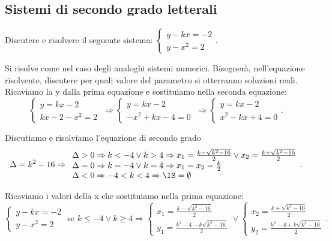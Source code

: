 \subsection{Sistemi di secondo grado letterali}
\begin{exrig}
\begin{esempio}
Discutere e risolvere il seguente sistema: \(\left\{\begin{array}{l}y-kx=-2\\y-x^2=2\end{array}\right.\).

Si risolve come nel caso degli analoghi sistemi numerici. Bisognerà, nell'equazione risolvente, discutere per quali valore del parametro si otterranno soluzioni reali. Ricaviamo la y dalla prima equazione e sostituiamo nella seconda equazione:
\[ \left\{\begin{array}{l}y=kx-2\\kx-2-x^2=2\end{array}\right.\ \Rightarrow\left\{\begin{array}{l}y=kx-2\\-x^2+kx-4=0\end{array}\right.\ \Rightarrow\left\{\begin{array}{l}y=kx-2\\x^2-kx+4=0\end{array}\right.. \]

Discutiamo e risolviamo l'equazione di secondo grado 
\[ \Delta =k^2-16 \Rightarrow
\begin{array}{l}\Delta >0\Rightarrow k<-4\vee k>4\Rightarrow x_1=\frac{k-\sqrt{k^2-16}} 2\vee x_2=\frac{k+\sqrt{k^2-16}} 2\\
\Delta =0\Rightarrow k=-4\vee k=4\Rightarrow x_1=x_2=\frac k 2 \\
\Delta <0\Rightarrow -4<k<4\Rightarrow \IS=\emptyset \end{array}. \]

Ricaviamo i valori della x che sostituiamo nella prima equazione: \[ \left\{\begin{array}{l}y-kx=-2\\y-x^2=2\end{array}\right.\text{ se }k\le -4\vee k\ge 4\Rightarrow \left\{\begin{array}{l}x_1=\frac{k-\sqrt{k^2-16}} 2 \\y_1=\frac{k^2-4-k\sqrt{k^2-16}} 2\end{array}\right.\vee \left\{\begin{array}{l}x_2=\frac{k+\sqrt{k^2-16}} 2 \\y_2=\frac{k^2-4+k\sqrt{k^2-16}} 2\end{array}\right.. \]
\end{esempio}
\end{exrig}

